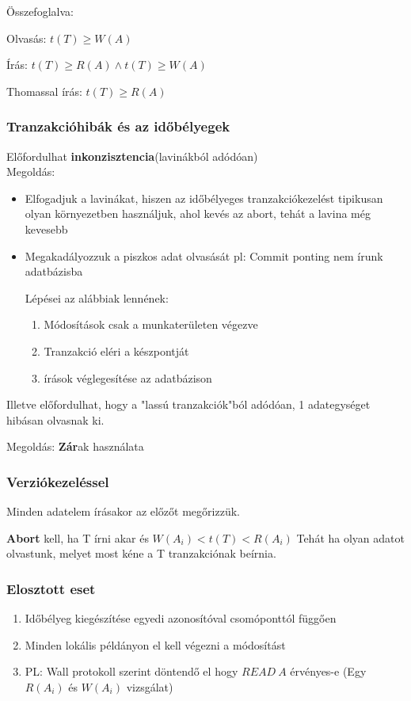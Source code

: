 Összefoglalva:

Olvasás: $t(T) \geq W(A)$ \checkmark

Írás: $t(T) \geq R(A) \land t(T) \geq W(A)$ \checkmark

Thomassal írás: $t(T) \geq R(A) $


\subsubsection{Tranzakcióhibák és az időbélyegek}

	Előfordulhat \textbf{inkonzisztencia}(lavinákból adódóan)\\[2pt]
	Megoldás:

		\begin{itemize}
			\item Elfogadjuk a lavinákat, hiszen az időbélyeges tranzakciókezelést tipikusan olyan környezetben használjuk, ahol kevés az abort, tehát a lavina még kevesebb
			\item Megakadályozzuk a piszkos adat olvasását pl: Commit ponting nem írunk adatbázisba

				Lépései az alábbiak lennének:

				\begin{enumerate}
					\item Módosítások csak a munkaterületen végezve
					\item Tranzakció eléri a készpontját
					\item írások véglegesítése az adatbázison
				\end{enumerate}
		\end{itemize}
Illetve előfordulhat, hogy a "lassú tranzakciók"ból adódóan, 1 adategységet hibásan olvasnak ki.

	Megoldás: \textbf{Zár}ak használata

\subsubsection{Verziókezeléssel}

	Minden adatelem írásakor az előzőt megőrizzük.

	\textbf{Abort} kell, ha T írni akar és $W(A_i) < t(T) < R(A_i)$ \quad Tehát ha olyan adatot olvastunk, melyet most kéne a T tranzakciónak beírnia.

\subsubsection{Elosztott eset}

 \begin{enumerate}
 	\item Időbélyeg kiegészítése egyedi azonosítóval csomóponttól függően
 	\item Minden lokális példányon el kell végezni a módosítást
 	\item PL: Wall protokoll szerint döntendő el hogy $READ\ A$ érvényes-e (Egy $R(A_i)$ és $W(A_i)$ vizsgálat)
 \end{enumerate}

